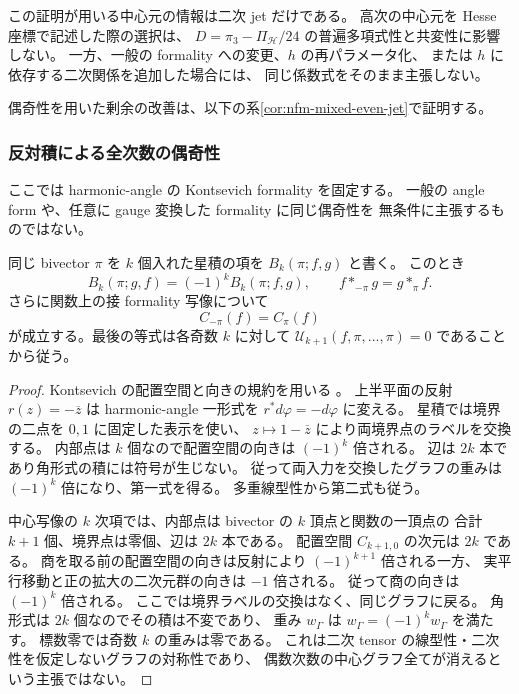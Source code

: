 \begin{remark}[規格化と適用範囲]
この証明が用いる中心元の情報は二次 jet だけである。
高次の中心元を Hesse 座標で記述した際の選択は、
$D=\pi_3-\Pi_{\mathscr H}/24$ の普遍多項式性と共変性に影響しない。
一方、一般の formality への変更、$h$ の再パラメータ化、
または $h$ に依存する二次関係を追加した場合には、
同じ係数式をそのまま主張しない。

偶奇性を用いた剰余の改善は、以下の系\ref{cor:nfm-mixed-even-jet}で証明する。
\end{remark}

\subsubsection{反対積による全次数の偶奇性}

ここでは harmonic-angle の Kontsevich formality を固定する。
一般の angle form や、任意に gauge 変換した formality に同じ偶奇性を
無条件に主張するものではない。
\begin{lemma}
\label{lem:nfm-harmonic-parity}
同じ bivector $\pi$ を $k$ 個入れた星積の項を $B_k(\pi;f,g)$ と書く。
このとき
\[
 B_k(\pi;g,f)=(-1)^kB_k(\pi;f,g),\qquad
 f*_{-\pi}g=g*_{\pi}f.
\]
さらに関数上の接 formality 写像について
\[
 C_{-\pi}(f)=C_{\pi}(f)
\]
が成立する。最後の等式は各奇数 $k$ に対して
$\mathcal U_{k+1}(f,\pi,\ldots,\pi)=0$ であることから従う。
\end{lemma}

\begin{proof}
Kontsevich の配置空間と向きの規約を用いる
\cite[Sections~2.2 and~6.2]{NFMKontsevich}。
上半平面の反射 $r(z)=-\overline z$ は harmonic-angle 一形式を
$r^*d\varphi=-d\varphi$ に変える。
星積では境界の二点を $0,1$ に固定した表示を使い、
$z\mapsto1-\overline z$ により両境界点のラベルを交換する。
内部点は $k$ 個なので配置空間の向きは $(-1)^k$ 倍される。
辺は $2k$ 本であり角形式の積には符号が生じない。
従って両入力を交換したグラフの重みは $(-1)^k$ 倍になり、第一式を得る。
多重線型性から第二式も従う。

中心写像の $k$ 次項では、内部点は bivector の $k$ 頂点と関数の一頂点の
合計 $k+1$ 個、境界点は零個、辺は $2k$ 本である。
配置空間 $C_{k+1,0}$ の次元は $2k$ である。
商を取る前の配置空間の向きは反射により $(-1)^{k+1}$ 倍される一方、
実平行移動と正の拡大の二次元群の向きは $-1$ 倍される。
従って商の向きは $(-1)^k$ 倍される。
ここでは境界ラベルの交換はなく、同じグラフに戻る。
角形式は $2k$ 個なのでその積は不変であり、
重み $w_\Gamma$ は $w_\Gamma=(-1)^k w_\Gamma$ を満たす。
標数零では奇数 $k$ の重みは零である。
これは二次 tensor の線型性・二次性を仮定しないグラフの対称性であり、
偶数次数の中心グラフ全てが消えるという主張ではない。
\end{proof}

